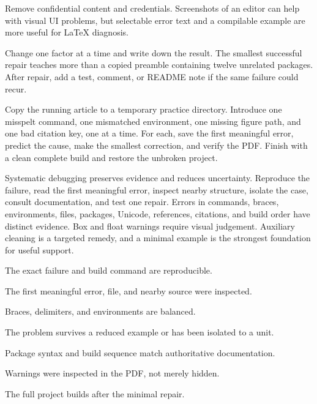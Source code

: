 Remove confidential content and credentials. Screenshots of an editor can help
with visual UI problems, but selectable error text and a compilable example are
more useful for \LaTeX{} diagnosis.

\begin{goodpractice}
Change one factor at a time and write down the result. The smallest successful
repair teaches more than a copied preamble containing twelve unrelated packages.
After repair, add a test, comment, or README note if the same failure could recur.
\end{goodpractice}

\chapterproject

\begin{miniproject}
Copy the running article to a temporary practice directory. Introduce one
misspelt command, one mismatched environment, one missing figure path, and one
bad citation key, one at a time. For each, save the first meaningful error,
predict the cause, make the smallest correction, and verify the PDF. Finish with
a clean complete build and restore the unbroken project.
\end{miniproject}

\chaptersummary

Systematic debugging preserves evidence and reduces uncertainty. Reproduce the
failure, read the first meaningful error, inspect nearby structure, isolate the
case, consult documentation, and test one repair. Errors in commands, braces,
environments, files, packages, Unicode, references, citations, and build order
have distinct evidence. Box and float warnings require visual judgement.
Auxiliary cleaning is a targeted remedy, and a minimal example is the strongest
foundation for useful support.

\chaptercheck
\begin{chapterchecklist}
  \item The exact failure and build command are reproducible.
  \item The first meaningful error, file, and nearby source were inspected.
  \item Braces, delimiters, and environments are balanced.
  \item The problem survives a reduced example or has been isolated to a unit.
  \item Package syntax and build sequence match authoritative documentation.
  \item Warnings were inspected in the PDF, not merely hidden.
  \item The full project builds after the minimal repair.
\end{chapterchecklist}

